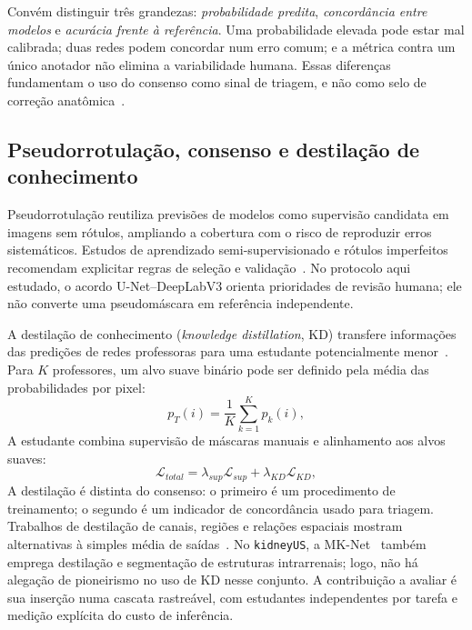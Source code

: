 \documentclass[12pt]{article}
\begin{document}
Convém distinguir três grandezas: \textit{probabilidade predita}, \textit{concordância entre modelos} e \textit{acurácia frente à referência}. Uma probabilidade elevada pode estar mal calibrada; duas redes podem concordar num erro comum; e a métrica contra um único anotador não elimina a variabilidade humana. Essas diferenças fundamentam o uso do consenso como sinal de triagem, e não como selo de correção anatômica~\cite{Lee2013PseudoLabel,Tajbakhsh2020Imperfect}.

\subsection{Pseudorrotulação, consenso e destilação de conhecimento}
Pseudorrotulação reutiliza previsões de modelos como supervisão candidata em imagens sem rótulos, ampliando a cobertura com o risco de reproduzir erros sistemáticos. Estudos de aprendizado semi-supervisionado e rótulos imperfeitos recomendam explicitar regras de seleção e validação~\cite{Lee2013PseudoLabel,Jiao2024SSLReview,Su2024ReliablePseudo,Huang2025SemiPLC}. No protocolo aqui estudado, o acordo U-Net--DeepLabV3 orienta prioridades de revisão humana; ele não converte uma pseudomáscara em referência independente.

A destilação de conhecimento (\textit{knowledge distillation}, KD) transfere informações das predições de redes professoras para uma estudante potencialmente menor~\cite{Hinton2015Distillation}. Para $K$ professores, um alvo suave binário pode ser definido pela média das probabilidades por pixel:
\begin{equation}
 p_T(i)=\frac{1}{K}\sum_{k=1}^{K}p_k(i),
 \label{eq:kd_teacher_mean}
\end{equation}
A estudante combina supervisão de máscaras manuais e alinhamento aos alvos suaves:
\begin{equation}
 \mathcal{L}_{total}=\lambda_{sup}\mathcal{L}_{sup}
 +\lambda_{KD}\mathcal{L}_{KD},
 \label{eq:kd_total}
\end{equation}
A destilação é distinta do consenso: o primeiro é um procedimento de treinamento; o segundo é um indicador de concordância usado para triagem. Trabalhos de destilação de canais, regiões e relações espaciais mostram alternativas à simples média de saídas~\cite{Shu2021ChannelKD,Qin2021MedicalKD,Zhao2023MSKD,Qi2024GKD}. No \texttt{kidneyUS}, a MK-Net~\cite{Chen2026MKNet} também emprega destilação e segmentação de estruturas intrarrenais; logo, não há alegação de pioneirismo no uso de KD nesse conjunto. A contribuição a avaliar é sua inserção numa cascata rastreável, com estudantes independentes por tarefa e medição explícita do custo de inferência.
\end{document}
